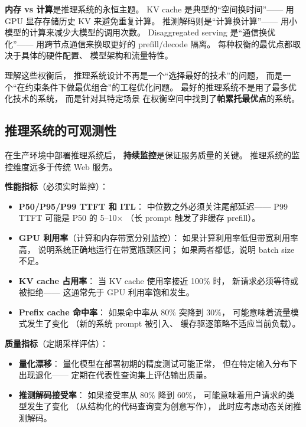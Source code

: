 \textbf{内存 vs 计算}是推理系统的永恒主题。
KV cache 是典型的``空间换时间''——
用 GPU 显存存储历史 KV 来避免重复计算。
推测解码则是``计算换计算''——
用小模型的计算来减少大模型的调用次数。
Disaggregated serving 是``通信换优化''——
用跨节点通信来换取更好的 prefill/decode 隔离。
每种权衡的最优点都取决于具体的硬件配置、
模型架构和流量特性。

理解这些权衡后，
推理系统设计不再是一个``选择最好的技术''的问题，
而是一个``在约束条件下做最优组合''的工程优化问题。
最好的推理系统不是用了最多优化技术的系统，
而是针对其特定场景
在权衡空间中找到了\textbf{帕累托最优点}的系统。

\subsection{推理系统的可观测性}

在生产环境中部署推理系统后，
\textbf{持续监控}是保证服务质量的关键。
推理系统的监控维度远多于传统 Web 服务。

\textbf{性能指标}（必须实时监控）：
\begin{itemize}[noitemsep]
  \item \textbf{P50/P95/P99 TTFT 和 ITL}：
        中位数之外必须关注尾部延迟——
        P99 TTFT 可能是 P50 的 5--10$\times$
        （长 prompt 触发了非缓存 prefill）。
  \item \textbf{GPU 利用率}（计算和内存带宽分别监控）：
        如果计算利用率低但带宽利用率高，
        说明系统正确地运行在带宽瓶颈区间；
        如果两者都低，说明 batch size 不足。
  \item \textbf{KV cache 占用率}：
        当 KV cache 使用率接近 100\% 时，
        新请求必须等待或被拒绝——
        这通常先于 GPU 利用率饱和发生。
  \item \textbf{Prefix cache 命中率}：
        如果命中率从 80\% 突降到 30\%，
        可能意味着流量模式发生了变化
        （新的系统 prompt 被引入、
        缓存驱逐策略不适应当前负载）。
\end{itemize}

\textbf{质量指标}（定期采样评估）：
\begin{itemize}[noitemsep]
  \item \textbf{量化漂移}：
        量化模型在部署初期的精度测试可能正常，
        但在特定输入分布下出现退化——
        定期在代表性查询集上评估输出质量。
  \item \textbf{推测解码接受率}：
        如果接受率从 80\% 降到 60\%，
        可能意味着用户请求的类型发生了变化
        （从结构化的代码查询变为创意写作），
        此时应考虑动态关闭推测解码。
\end{itemize}

